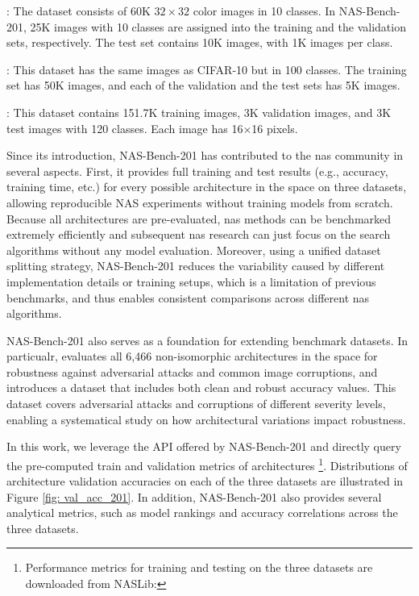 \documentclass[a4paper,oneside,bibliography=totoc]{scrbook}
\begin{document}
\begin{description}[leftmargin=0cm, listparindent=\parindent]
 	\item[CIFAR10]:	The dataset consists of 60K $32\times32$ color images in 10 classes. In NAS-Bench-201, 25K images with 10 classes are assigned into the training and the validation sets, respectively. The test set contains 10K images, with 1K images per class.
 	\item[CIFAR100]: This dataset has the same images as CIFAR-10 but in 100 classes. The training set has 50K images, and each of the validation and the test sets has 5K images.
 	\item[ImageNet16-120]: This dataset contains 151.7K training images, 3K validation images, and 3K test images with 120 classes. Each image has 16$\times$16 pixels.
\end{description} 


Since its introduction, NAS-Bench-201 has contributed to the \gls{nas} community in several aspects. First, it provides full training and test results (e.g., accuracy, training time, etc.) for every possible architecture in the space on three datasets, allowing reproducible NAS experiments without training models from scratch. Because all architectures are pre-evaluated, \gls{nas} methods can be benchmarked extremely efficiently and subsequent \gls{nas} research can just focus on the search algorithms without any model evaluation. Moreover, using a unified dataset splitting strategy, NAS-Bench-201 reduces the variability caused by different implementation details or training setups, which is a limitation of previous benchmarks, and thus enables consistent comparisons across different \gls{nas} algorithms. 

\vspace{0.2em}	
NAS-Bench-201 also serves as a foundation for extending benchmark datasets. In particualr, \cite{jung2023neural} evaluates all 6,466 non-isomorphic architectures in the space for robustness against adversarial attacks and common image corruptions, and introduces a dataset that includes both clean and robust accuracy values. This dataset covers adversarial attacks and corruptions of different severity levels, enabling a systematical study on how architectural variations impact robustness.

\vspace{0.2em}
In this work, we leverage the API offered by NAS-Bench-201 and directly query the pre-computed train and validation metrics of architectures \footnote{Performance metrics for training and testing on the three datasets are downloaded from NASLib: }. Distributions of architecture validation accuracies on each of the three datasets are illustrated in Figure \ref{fig: val_acc_201}. In addition, NAS-Bench-201 also provides several analytical metrics, such as model rankings and accuracy correlations across the three datasets.
\end{document}
